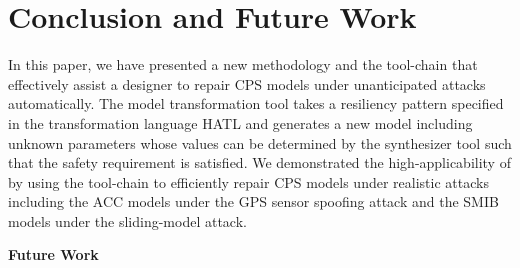\section{Conclusion and Future Work}
%
In this paper, we have presented a new methodology and the tool-chain \toolreaffirm that effectively assist a designer to repair CPS models under unanticipated attacks automatically. 
%
The model transformation tool takes a resiliency pattern specified in the transformation language HATL and generates a new model including unknown parameters whose values can be determined by the synthesizer tool such that the safety requirement is satisfied.
%
We demonstrated the high-applicability of \toolreaffirm by using the tool-chain to efficiently repair CPS models under realistic attacks including the ACC models under the GPS sensor spoofing attack and the SMIB models under the sliding-model attack.

\vspace{0.5em}
\noindent
{\bf Future Work}

%
%
%
